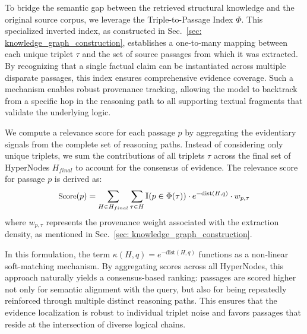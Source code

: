 To bridge the semantic gap between the retrieved structural knowledge and the original source corpus, we leverage the Triple-to-Passage Index $\Phi$. This specialized inverted index, as constructed in Sec.~\ref{sec: knowledge_graph_construction}, establishes a one-to-many mapping between each unique triplet $\tau$ and the set of source passages from which it was extracted. By recognizing that a single factual claim can be instantiated across multiple disparate passages, this index ensures comprehensive evidence coverage. Such a mechanism enables robust provenance tracking, allowing the model to backtrack from a specific hop in the reasoning path to all supporting textual fragments that validate the underlying logic.

We compute a relevance score for each passage $p$ by aggregating the evidentiary signals from the complete set of reasoning paths. Instead of considering only unique triplets, we sum the contributions of all triplets $\tau$ across the final set of HyperNodes $H_{final}$ to account for the consensus of evidence. The relevance score for passage $p$ is derived as:
\vspace{-2pt}
\begin{equation}
    \small
    \text{Score}(p) = \sum_{H \in H_{final}} \sum_{\tau \in H} \mathbb{I}(p \in \Phi(\tau)) \cdot e^{-\text{dist}(H, q)} \cdot w_{p, \tau}
\end{equation}
where $w_{p,\tau}$ represents the provenance weight associated with the extraction density, as mentioned in Sec.~\ref{sec: knowledge_graph_construction}.

In this formulation, the term $\kappa(H, q) = e^{-\text{dist}(H, q)}$ functions as a non-linear soft-matching mechanism. 
By aggregating scores across all HyperNodes, this approach naturally yields a consensus-based ranking: passages are scored higher not only for semantic alignment with the query, but also for being repeatedly reinforced through multiple distinct reasoning paths.
This ensures that the evidence localization is robust to individual triplet noise and favors passages that reside at the intersection of diverse logical chains.

